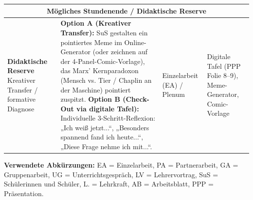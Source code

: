 \documentclass[a4paper, fontsize=9pt, landscape]{scrartcl}
\begin{document}
\begin{tabularx}{\textwidth}{|p{3.2cm}|X|p{3.0cm}|p{3.4cm}|}
\multicolumn{4}{|c|}{\cellcolor{tableGray}\textbf{Mögliches Stundenende / Didaktische Reserve}} \\
\hline
\textbf{Didaktische} \newline \textbf{Reserve} \newline
\tiny\color{primaryBlue} Kreativer Transfer / \newline formative Diagnose & 
\textbf{Option A (Kreativer Transfer):} SuS gestalten ein pointiertes Meme im Online-Generator (oder zeichnen auf der 4-Panel-Comic-Vorlage), das Marx’ Kernparadoxon (Mensch vs. Tier / Chaplin an der Maschine) pointiert zuspitzt. \newline
\textbf{Option B (Check-Out via digitale Tafel):} Individuelle 3-Schritt-Reflexion: „Ich weiß jetzt...“, „Besonders spannend fand ich heute...“, „Diese Frage nehme ich mit...“. & 
Einzelarbeit (EA) / \newline
Plenum & 
Digitale Tafel \newline
(PPP Folie 8--9), \newline
Meme-Generator, \newline
Comic-Vorlage \\
\hline

\end{tabularx}

\vspace{0.06cm}
\noindent
{\tiny\textbf{Verwendete Abkürzungen:} EA = Einzelarbeit, PA = Partnerarbeit, GA = Gruppenarbeit, UG = Unterrichtsgespräch, LV = Lehrervortrag, SuS = Schülerinnen und Schüler, L. = Lehrkraft, AB = Arbeitsblatt, PPP = Präsentation.}
\end{document}
